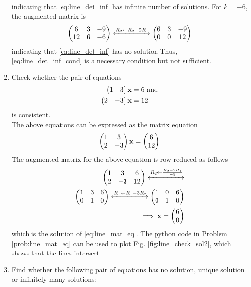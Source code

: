 \documentclass[journal,12pt,twocolumn]{IEEEtran}
\renewcommand\thesection{\arabic{section}}
\begin{document}
\begin{enumerate}[label=\thesection.\arabic*.,ref=\thesection.\theenumi]
\begin{align}
\end{align}
%
indicating that \eqref{eq:line_det_inf} has infinite number of solutions. For $k = -6$, the augmented matrix is 
\begin{align}
\begin{pmatrix}6 & 3 & -9\\12 &  6 & -6\end{pmatrix} 
\xleftrightarrow {R_2\leftarrow R_2-2R_1}\begin{pmatrix}6 & 3 & -9\\0 &  0 & 12\end{pmatrix} 
\end{align}
indicating that \eqref{eq:line_det_inf} has no solution
%
Thus, \eqref{eq:line_det_inf_cond} is a necessary condition but not sufficient.
\item Check whether the pair of equations 
\begin{align}
\label{eq:line_mat_eq_2}
\begin{split}
\begin{pmatrix}1 & 3\end{pmatrix}\mathbf{x}  &= 6 \text{ and}
\\
\begin{pmatrix} 2 & -3\end{pmatrix}\mathbf{x} &= 12 
\end{split}
\end{align}
%
is consistent. 
\\
\solution The above equations can be expressed as the matrix equation
\begin{align}
\begin{pmatrix}1 & 3\\2 & -3\end{pmatrix} \mathbf{x} = \begin{pmatrix}6\\12\end{pmatrix}
\end{align}
%
The augmented matrix for the above equation is row reduced as follows
\begin{align}
\begin{pmatrix}1 & 3 & 6\\2 & -3 & 12\end{pmatrix} 
\xleftrightarrow {R_2\leftarrow \frac{R_2-2R_1}{-9}}
\\
\begin{pmatrix}1 & 3 & 6\\0 & 1 & 0\end{pmatrix} 
\xleftrightarrow {R_1\leftarrow R_1 - 3R_2}\begin{pmatrix}1 & 0 & 6\\0 & 1 & 0\end{pmatrix} 
\\
\implies \mathbf{x} = \begin{pmatrix}6\\0\end{pmatrix}
\end{align}
%
which is the solution of \ref{eq:line_mat_eq}.
The python code in Problem \ref{prob:line_mat_eq}
%
%
can be used to plot Fig. \ref{fig:line_check_sol2}, which shows that the lines intersect.
%
%
%
\item Find whether the following pair of equations has no solution, unique solution or infinitely many solutions: 

\end{enumerate}
\end{document}

